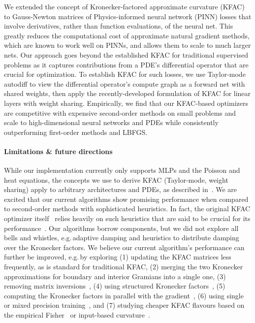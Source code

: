 We extended the concept of Kronecker-factored approximate curvature (KFAC) to Gauss-Newton matrices of Physics-informed neural network (PINN) losses that involve derivatives, rather than function evaluations, of the neural net.
This greatly reduces the computational cost of approximate natural gradient methods, which are known to work well on PINNs, and allows them to scale to much larger nets.
Our approach goes beyond the established KFAC for traditional supervised problems as it captures contributions from a PDE's differential operator that are crucial for optimization.
To establish KFAC for such losses, we use Taylor-mode autodiff to view the differential operator's compute graph as a forward net with shared weights, then apply the recently-developed formulation of KFAC for linear layers with weight sharing.
Empirically, we find that our KFAC-based optimizers are competitive with expensive second-order methods on small problems and scale to high-dimensional neural networks and PDEs while consistently outperforming first-order methods and LBFGS.

\paragraph{Limitations \& future directions} While our implementation currently only supports MLPs and the Poisson and heat equations, the concepts we use to derive KFAC (Taylor-mode, weight sharing) apply to arbitrary architectures and PDEs, as described in~.
We are excited that our current algorithms show promising performance when compared to second-order methods with sophisticated heuristics.
In fact, the original KFAC optimizer itself~\cite{martens2015optimizing} relies heavily on such heuristics that are said to be crucial for its performance~\cite{clarke2023adam}.
Our algorithms borrow components, but we did not explore all bells and whistles, e.g.\,adaptive damping and heuristics to distribute damping over the Kronecker factors.
We believe our current algorithm's performance can further be improved, e.g.\,by exploring (1) updating the KFAC matrices less frequently, as is standard for traditional KFAC, (2) merging the two Kronecker approximations for boundary and interior Gramians into a single one, (3) removing matrix inversions~\cite{lin2023simplifying}, (4) using structured Kronecker factors~\cite{lin2023structured}, (5) computing the Kronecker factors in parallel with the gradient~\cite{dangel2020backpack}, (6) using single or mixed precision training~\cite{micikevicius2017mixed}, and (7) studying cheaper KFAC flavours based on the empirical Fisher~\cite{kunstner2019limitations} or input-based curvature~\cite{benzing2022gradient,petersen2023isaac}.
